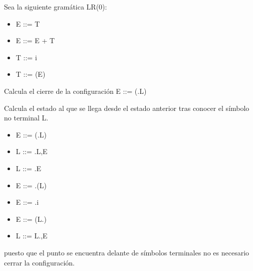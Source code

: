 \documentclass[nochap]{apuntes}
\begin{document}
\begin{problem}
Sea la siguiente gramática LR(0):
\begin{itemize}
\item E ::= T
\item E ::= E + T
\item T ::= i
\item T ::= (E)
\end{itemize}

\ppart Calcula el cierre de la configuración E ::= (.L)

\ppart Calcula el estado al que se llega desde el estado anterior tras conocer el símbolo no terminal L.
\solution
\ppart
\begin{itemize}
\item E ::= (.L)
\item L ::= .L,E
\item L ::= .E
\item E ::= .(L)
\item E ::= .i
\end{itemize}

\ppart
\begin{itemize}
\item E ::= (L.)
\item L ::= L.,E
\end{itemize}
puesto que el punto se encuentra delante de símbolos terminales no es necesario cerrar la configuración.
\end{problem}
\end{document}
